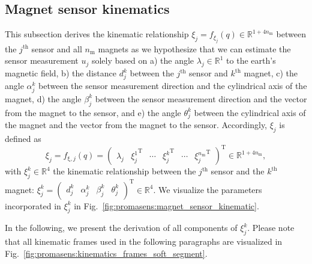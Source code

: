 \subsection{Magnet sensor kinematics}\label{sub:promasens:kinematic_model_magnet_sensor_kinematics}
This subsection derives the kinematic relationship $\xi_j = f_{\xi_j}(q) \in \mathbb{R}^{1+4n_\mathrm{m}}$ between the $j^\mathrm{th}$ sensor and all $n_\mathrm{m}$ magnets as we hypothesize that we can estimate the sensor measurement $u_j$ solely based on
a) the angle $\lambda_j \in \mathbb{R}^1$ to the earth's magnetic field,
b) the distance $d_j^k$  between the $j^\mathrm{th}$ sensor and $k^\mathrm{th}$ magnet,
c) the angle $\alpha_j^k$ between the sensor measurement direction and the cylindrical axis of the magnet,
d) the angle $\beta_j^k$ between the sensor measurement direction and the vector from the magnet to the sensor,
and e) the angle $\theta_j^k$ between the cylindrical axis of the magnet and the vector from the magnet to the sensor.
Accordingly, $\xi_j$ is defined as
\begin{equation}
    \xi_{j} = f_{\mathrm{\xi},j}(q) =
    \begin{pmatrix}
        \lambda_{j} & {\xi_{j}^1}^\mathrm{T} & \cdots & {\xi_{j}^k}^\mathrm{T} & \cdots & {\xi_{j}^{n_\mathrm{m}}}^\mathrm{T}
    \end{pmatrix}^\mathrm{T} \in \mathbb{R}^{1 + 4n_\mathrm{m}},
\end{equation}
with $\xi_j^{k} \in \mathbb{R}^4$ the kinematic relationship between the $j^\mathrm{th}$ sensor and the $k^\mathrm{th}$ magnet: $\xi_j^{k} = \begin{pmatrix} d_j^k & \alpha_j^k & \beta_j^k & \theta_j^k \end{pmatrix}^\mathrm{T} \in \mathbb{R}^4$. We visualize the parameters incorporated in $\xi_j^{k}$ in Fig.~\ref{fig:promasens:magnet_sensor_kinematic}.

In the following, we present the derivation of all components of $\xi_j^{k}$. 
Please note that all kinematic frames used in the following paragraphs are visualized in Fig.~\ref{fig:promasens:kinematics_frames_soft_segment}.

